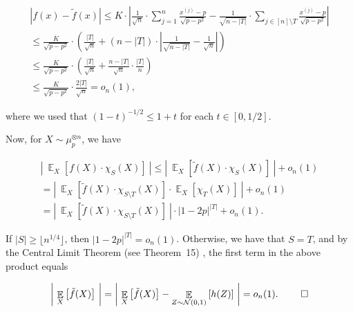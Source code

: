 \documentclass[10pt,a4paper]{article}
\begin{document}
\begin{itemize}
\[\begin{gathered}
\displaystyle\left|f(x)-\tilde{f}(x)\right| \displaystyle\leqslant K\cdot\left|\frac{1}{\sqrt{n}}\cdot\sum_{j=1}^{n}\frac{x^{\left(j\right)}-p}{\sqrt{p-p^{2}}}-\frac{1}{\sqrt{n-\left|T\right|}}\cdot\sum_{j\in[n]\setminus T}\frac{x^{\left(j\right)}-p}{\sqrt{p-p^{2}}}\right| \\
\displaystyle\leqslant\frac{K}{\sqrt{p-p^{2}}}\cdot\left(\frac{\left|T\right|}{\sqrt{n}}+\left(n-\left|T\right|\right)\cdot\left|\frac{1}{\sqrt{n-\left|T\right|}}-\frac{1}{\sqrt{n}}\right|\right) \\
\displaystyle\leqslant\frac{K}{\sqrt{p-p^{2}}}\cdot\left(\frac{\left|T\right|}{\sqrt{n}}+\frac{n-\left|T\right|}{\sqrt{n}}\cdot\frac{\left|T\right|}{n}\right) \\
\displaystyle\leqslant\frac{K}{\sqrt{p-p^{2}}}\cdot\frac{2\left|T\right|}{\sqrt{n}}=o_{n}(1),
\end{gathered}\]


where we used that $(1-t)^{-1/2}\leqslant 1+t$ for each $t\in[0,1/2]$.\par




Now, for $X\sim\mu_{p}^{\otimes n}$, we have\par


\[\begin{gathered}
\displaystyle\left|\ \mathop{\mathbb{E}}_{X}\left[f(X)\cdot\chi_{S}(X)\right]\ \right| \displaystyle\leqslant\left|\ \mathop{\mathbb{E}}_{X}\left[\tilde{f}(X)\cdot\chi_{S}(X)\right]\ \right|+o_{n}(1) \\
\displaystyle=\left|\ \mathop{\mathbb{E}}_{X}\left[\tilde{f}(X)\cdot\chi_{S\setminus T}(X)\right]\cdot\mathop{\mathbb{E}}_{X}\left[\chi_{T}(X)\right]\ \right|+o_{n}(1) \\
\displaystyle=\left|\ \mathop{\mathbb{E}}_{X}\left[\tilde{f}(X)\cdot\chi_{S\setminus T}(X)\right]\ \right|\cdot\left|1-2p\right|^{\left|T\right|}+o_{n}(1).
\end{gathered}\]


If $\left|S\right|\geqslant\lfloor n^{1/4}\rfloor$, then $\left|1-2p\right|^{\left|T\right|}=o_{n}(1)$.
Otherwise, we have that $S=T$, and by the Central Limit Theorem (see Theorem 15) , the first term in the above product equals\par


\[\begin{gathered}
\left|\ \mathop{\mathbb{E}}_{X}\left[\tilde{f}(X)\right]\ \right|=\left|\ \mathop{\mathbb{E}}_{X}\left[\tilde{f}(X)\right]-\mathop{\mathbb{E}}_{Z\sim\mathcal{N}(0,1)}\left[h(Z)\right]\ \right|=o_{n}(1).\ \qed
\end{gathered}\]





\end{itemize}
\end{document}
